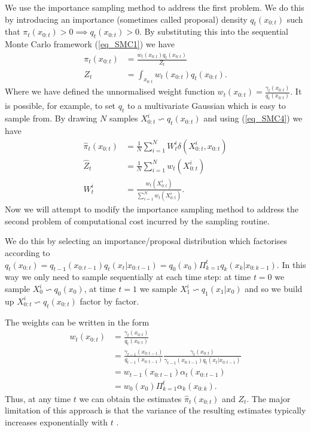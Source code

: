 We use the importance sampling method to address the first problem. We do this by introducing an importance (sometimes called proposal) density $q_t(x_{0:t})$ such that $\pi_t(x_{0:t}) > 0 \implies q_t(x_{0:t}) > 0$. By substituting this into the sequential Monte Carlo framework (\ref{eq_SMC1}) we have
\begin{equation}
\begin{aligned}
\pi_t(x_{0:t}) &= \frac{w_t(x_{0:t})q_t(x_{0:t})}{Z_t} \\
Z_t &= \int_{x_{0:t}} w_t(x_{0:t})q_t(x_{0:t}).
\end{aligned}
\label{eq_SMC4}
\end{equation} 
Where we have defined the unnormalised weight function $w_t(x_{0:t}) = \frac{\gamma_t(x_{0:t})}{q_t(x_{0:t})}$. It is possible, for example, to set $q_t$ to a multivariate Gaussian which is easy to sample from. By drawing $N$ samples $X_{0:t}^i \backsim q_t(x_{0:t})$ and using (\ref{eq_SMC4}) we have 
\begin{equation}
\begin{aligned}
\hat{\pi}_t(x_{0:t}) &= \frac{1}{N}\sum_{i=1}^N W_t^i\delta(X^i_{0:t}, x_{0:t}) \\
\hat{Z}_t &= \frac{1}{N}\sum_{i=1}^N w_t(X^i_{0:t}) \\
W^i_t &= \frac{w_t(X^i_{0:t})}{\sum_{i=1}^N w_t(X^i_{0:t})}.
\end{aligned}
\label{eq_SMC5}
\end{equation}
Now we will attempt to modify the importance sampling method to address the second problem of computational cost incurred by the sampling routine. 

We do this by selecting an importance/proposal distribution which factorises according to $q_t(x_{0:t}) = q_{t-1}(x_{0:t-1})q_t(x_{t}|x_{0:t-1}) = q_0(x_0) \Pi_{k=1}^t q_k(x_k|x_{0:k-1})$. In this way we only need to sample sequentially at each time step: at time $t=0$ we sample $X_0^i \backsim q_0(x_0)$, at time $t=1$ we sample $X_{1}^i \backsim q_1(x_1|x_0)$ and so we build up $X^i_{0:t} \backsim q_t(x_{0:t})$ factor by factor.

The weights can be written in the form
\begin{equation}
\begin{aligned}
w_t(x_{0:t}) &= \frac{\gamma_t(x_{0:t})}{q_t(x_{0:t})} \\
&= \frac{\gamma_{t-1}(x_{0:t-1})}{q_{t-1}(x_{0:t-1})}\frac{\gamma_t(x_{0:t})}{\gamma_{t-1}(x_{0:t-1})q_t(x_t|x_{0:t-1})} \\
&= w_{t-1}(x_{0:t-1})\alpha_t(x_{0:t-1}) \\
&= w_0(x_0)\Pi_{k=1}^t \alpha_k(x_{0:k}).
\end{aligned}
\label{eq_SMC6}
\end{equation}
Thus, at any time $t$ we can obtain the estimates $\hat{\pi}_t(x_{0:t})$ and $Z_t$. The major limitation of this approach is that the variance of the resulting estimates typically increases exponentially with $t$ \cite{pftut}. 

